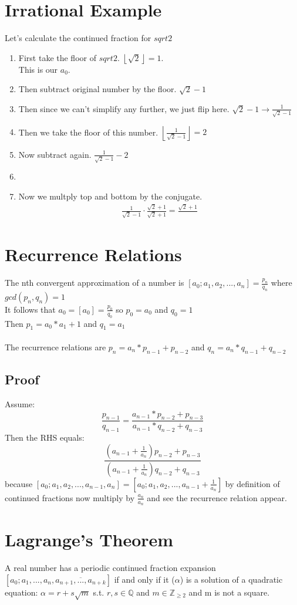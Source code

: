 \documentclass{article}
\begin{document}
\section*{Irrational Example}
Let's calculate the continued fraction for $sqrt{2}$

\begin{enumerate}
    \item First take the floor of $sqrt{2}$. $\left\lfloor{\sqrt{2}}\right\rfloor = 1$.\\This is our $a_0$.
    \item Then subtract original number by the floor. $\sqrt{2}-1$
    \item Then since we can't simplify any further, we just flip here. $\sqrt{2}-1 \rightarrow \frac{1}{\sqrt{2}-1}$
    \item Then we take the floor of this number. $\left\lfloor \frac{1}{\sqrt{2}-1} \right\rfloor = 2$
    \item Now subtract again. $\frac{1}{\sqrt{2}-1} - 2$
    \item 
    \item Now we multply top and bottom by the conjugate.
    \begin{align*}
        \frac{1}{\sqrt{2}-1}\cdot \frac{\sqrt{2}+1}{\sqrt{2}+1} 
        = \frac{\sqrt{2}+1}{}
    \end{align*}
\end{enumerate}



\section*{Recurrence Relations}
The nth convergent approximation of a number is $[a_0; a_1, a_2, ..., a_n] = \frac{p_n}{q_n}$ 
where $gcd(p_n, q_n) = 1$ \\
It follows that $a_0 = [a_0] = \frac{p_0}{q_0}$ so $p_0 = a_0$ and $q_0 = 1$\\
Then $p_1 = a_0 * a_1 + 1$ and $q_1 = a_1$\\
\\
The recurrence relations are $p_n = a_n * p_{n-1} + p_{n-2}$ and $q_n = a_n * q_{n-1} + q_{n-2}$

\subsection*{Proof}
Assume:
$$
\frac{p_{n-1}}{q_{n-1}} = \frac{a_{n-1}*p_{n-2} + p_{n-3}}{a_{n-1} * q_{n-2} + q_{n-3}}
$$
Then the RHS equals:
$$
\frac{(a_{n-1}+\frac{1}{a_n})p_{n-2} + p_{n-3}}{(a_{n-1}+\frac{1}{a_n})q_{n-2} + q_{n-3}}
$$
because $[a_0;a_1,a_2,...,a_{n-1},a_n] = [a_0;a_1,a_2,...,a_{n-1}+\frac{1}{a_n}]$ by definition of continued fractions
now multiply by $\frac{a_n}{a_n}$ and see the recurrence relation appear.


\section*{Lagrange's Theorem}
A real number has a periodic continued fraction expansion $[a_0;a_1,...,a_n,\overline{a_{n+1},...,a_{n+k}}]$ 
if and only if it ($\alpha$) is a solution of a quadratic equation: $\alpha = r+s\sqrt{m}$ s.t. $r,s\in \mathbb{Q}$ and $m \in \mathbb{Z}_{\geq 2}$ and m is not a square. 
\end{document}
